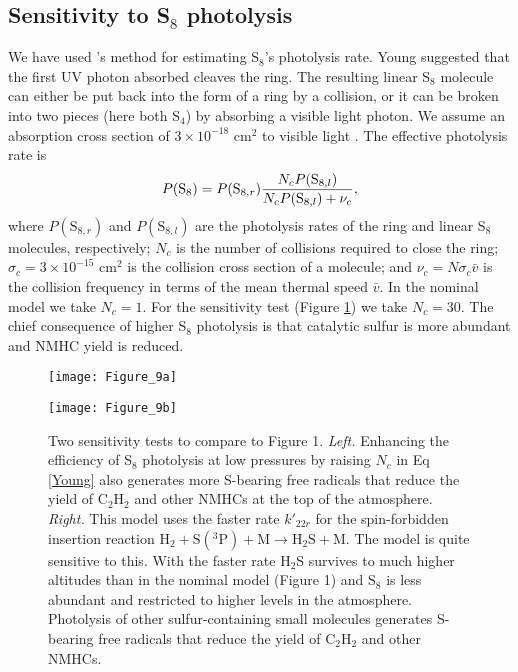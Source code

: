 \documentclass[preprint]{aastex}
\newcounter{reaction}
\begin{document}
\subsection{Sensitivity to S$_8$ photolysis}

We have used \citet{Young1983}'s method for estimating S$_8$'s photolysis rate.
Young suggested that the first UV photon absorbed cleaves the ring.
The resulting linear S$_8$ molecule can either be put back into the form of a ring by a collision,
or it can be broken into two pieces (here both S$_4$) by absorbing a visible light photon.
We assume an absorption cross section of $3\times 10^{-18}$ cm$^2$ to visible light \citep[$\lambda < 850$ nm,][]{Meyer1976}.
 The effective photolysis rate is 
\begin{equation}
\label{Young}
 P(\mathrm{S}_{8}) = P(\mathrm{S}_{8,r}) {N_c P(\mathrm{S}_{8,l})\over N_c P(\mathrm{S}_{8,l}) + \nu_{c} },
\end{equation} 
 where $P(\mathrm{S}_{8,r})$ and $P(\mathrm{S}_{8,l})$ 
 are the photolysis rates of the ring and linear S$_8$ molecules, respectively;
 $N_{c}$ is the number of collisions required to close the ring;
$\sigma_{c}=3\times 10^{-15}$ cm$^2$ is the collision cross section of a molecule;
and $\nu_{c} = N\sigma_{c}{\bar v}$ is the collision frequency in terms of the mean thermal speed ${\bar v}$. 
In the nominal model we take $N_{c}=1$.  For the sensitivity test (Figure \ref{sensitivity}) we take $N_c=30$.
The chief consequence of higher S$_8$ photolysis is that catalytic sulfur is more abundant
 and NMHC yield is reduced. 

\begin{figure}[!htb]
 \centering
  \begin{minipage}[c]{0.49\textwidth}
   \centering
 \texttt{[image: Figure\_9a]} 
 \end{minipage}
\begin{minipage}[c]{0.49\textwidth}
   \centering
  \texttt{[image: Figure\_9b]} 
 \end{minipage}
  \caption{\small Two sensitivity tests to compare to Figure 1.
   {\it Left.} Enhancing the efficiency of S$_8$ photolysis at low pressures by raising $N_c$ in Eq \ref{Young}
   also generates more S-bearing free radicals that reduce the yield of C$_2$H$_2$ and other NMHCs at the top of the atmosphere.
   {\it Right.} This model uses the faster rate $k'_{22r}$ for the spin-forbidden insertion reaction
   $\mathrm{H}_2 + \mathrm{S}(^3\mathrm{P}) + \mathrm{M} \rightarrow \mathrm{H}_2\mathrm{S} + \mathrm{M} $. 
   The model is quite sensitive to this.
   With the faster rate H$_2$S survives to much higher altitudes than in the nominal model (Figure 1) and
   S$_8$ is less abundant and restricted to higher levels in the atmosphere.  Photolysis of
   other sulfur-containing small molecules generates S-bearing free radicals that reduce the yield of C$_2$H$_2$ and other NMHCs. 
  }
\label{sensitivity}
\end{figure}
\end{document}
